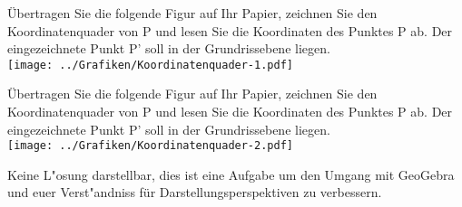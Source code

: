 \begin{Aufgabe}
Übertragen Sie die folgende Figur auf Ihr Papier, zeichnen Sie den Koordinatenquader von P und lesen
Sie die Koordinaten des Punktes P ab. Der eingezeichnete Punkt P’ soll in der Grundrissebene liegen.\\
\texttt{[image: ../Grafiken/Koordinatenquader-1.pdf]}

Übertragen Sie die folgende Figur auf Ihr Papier, zeichnen Sie den Koordinatenquader von P und lesen
Sie die Koordinaten des Punktes P ab. Der eingezeichnete Punkt P’ soll in der Grundrissebene liegen.\\
\texttt{[image: ../Grafiken/Koordinatenquader-2.pdf]}
\end{Aufgabe}
\begin{Loesung}
Keine L"osung darstellbar, dies ist eine Aufgabe um den Umgang mit GeoGebra und euer Verst"andniss für Darstellungsperspektiven zu verbessern.
\end{Loesung}

